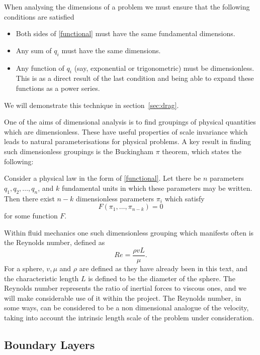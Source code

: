 When analysing the dimensions of a problem we must ensure that the following conditions are
satisfied
\begin{itemize}
\item Both sides of \eqref{functional} must have the same fundamental dimensions.
\item Any sum of $q_i$ must have the same dimensions.
\item Any function of $q_i$ (say, exponential or trigonometric) must be dimensionless. This is as a 
direct result of the last condition and being able to expand these functions as a power series.
\end{itemize}

We will demonstrate this technique in section~\ref{sec:drag}.

One of the aims of dimensional analysis is to find groupings of physical quantities which are
dimensionless. These have useful properties of scale invariance which leads to natural parameterisations
for physical problems. A key result in finding such dimensionless groupings is the Buckingham $\pi$ 
theorem, which states the following:

\begin{bucktheorem}[Buckingham $\pi$]
Consider a physical law in the form of \eqref{functional}. Let there be $n$ parameters $q_1,q_2,\ldots,q_n$,
and $k$ fundamental units in which these parameters may be written. Then there exist $n-k$ dimensionless
parameters $\pi_i$ which satisfy
\[
F(\pi_1, \ldots, \pi_{n-k}) = 0
\]
for some function $F$.
\end{bucktheorem}

Within fluid mechanics one such dimensionless grouping which manifests often is the Reynolds
number, defined as 
\begin{equation} \label{re-number}
Re = \frac{\rho v L}{\mu} .
\end{equation}
For a sphere, $v, \mu$ and $\rho$ are defined as they have already been in this text, and the
characteristic length $L$ is defined to be the diameter of the sphere.
The Reynolds number represents the ratio of inertial forces to viscous ones, and we will make considerable
use of it within the project. The Reynolds number, in some ways, can be considered to be a non
dimensional analogue of the velocity, taking into account the intrinsic length scale of the problem
under consideration.

\subsection{Boundary Layers}

